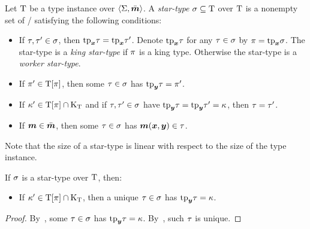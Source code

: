 \begin{definition}
Let $\mathrm{T}$ be a type instance over $\left\langle \mathrm{\Sigma},\bar{\bm{m}} \right\rangle$.
A \emph{star-type} $\sigma \subseteq \mathrm{T}$ over $\mathrm{T}$ is a nonempty
set of \twotypes/ satisfying the following conditions:
\begin{itemize}
  \item[\condstpx]\label{cond:stpx}
  If $\tau, {\tau'} \in \sigma$, then $\mathrm{tp}_{\bm{x}}\tau = \mathrm{tp}_{\bm{x}}{\tau'}$.
  Denote $\mathrm{tp}_{\bm{x}}\tau$ for any $\tau \in \sigma$ by $\pi=\mathrm{tp}_{\bm{x}}\sigma$.
  The star-type is a \emph{king star-type} if $\pi$ is a king type.
  Otherwise the star-type is a \emph{worker star-type}.
  
  \item[\condstppy]\label{cond:stppy}
  If ${\pi'} \in \mathrm{T}[\pi]$, then some $\tau\in\sigma$ has
  $\mathrm{tp}_{\bm{y}}\tau = {\pi'}$.
  
  \item[\condstpky]\label{cond:stpky}
  If ${\kappa'} \in \mathrm{T}[\pi]\cap{\mathrm{K}}_{\mathrm{T}}$
  and if $\tau,{\tau'} \in \sigma$ have $\mathrm{tp}_{\bm{y}}\tau = \mathrm{tp}_{\bm{y}}{\tau'} = \kappa$,
  then $\tau = {\tau'}$.
  
  \item[\condstpm]\label{cond:stpm}
  If $\bm{m} \in \bar{\bm{m}}$, then some $\tau\in\sigma$ has $\bm{m}(\bm{x},\bm{y}) \in \tau$.
\end{itemize}
\end{definition}
Note that the size of a star-type is linear with respect to the size of the type
instance.
\begin{remark}
If $\sigma$ is a star-type over $\mathrm{T}$, then:
\begin{itemize}
  \item[\condstpkyu]\label{cond:stpkyu}
  If ${\kappa'} \in \mathrm{T}[\pi]\cap{\mathrm{K}}_{\mathrm{T}}$,
  then a unique $\tau\in\sigma$ has $\mathrm{tp}_{\bm{y}}\tau = \kappa$.
\end{itemize}
\end{remark}
\begin{proof}
By~, some $\tau\in\sigma$ has $\mathrm{tp}_{\bm{y}}\tau = \kappa$.
By~, such $\tau$ is unique.
\end{proof}

